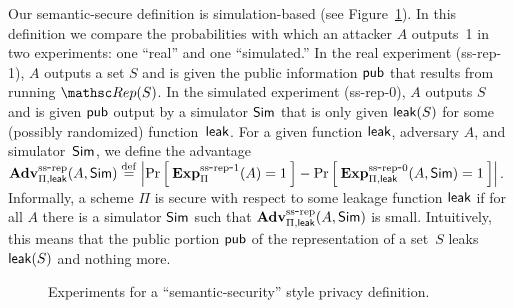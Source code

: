 Our semantic-secure definition is simulation-based (see Figure~\ref{fig:privacy-ss}).
In this definition we compare the probabilities with which an attacker $A$ outputs~1
in two experiments: one ``real'' and one ``simulated.''
In the real experiment (ss-rep-1), $A$ outputs a set $S$  and is given the
public information ${\sf pub}$ that results from running $\Rep(S)$.
In the simulated experiment (ss-rep-0), $A$ outputs $S$ and is given ${\sf pub}$ output
by a simulator ${\sf Sim}$ that is only given ${\sf leak}(S)$ for some (possibly randomized)
function~${\sf leak}$.
For a given function ${\sf leak}$, adversary $A$, and simulator~${\sf Sim}$,
we define the advantage
$\mathrm{\mathbf{Adv}}^{\mathrm{ss\mbox{-}rep}}_{\Pi,{\sf leak}}(A,{\sf Sim}) \stackrel{\rm def}{=}
\left| \Pr\left[\: \mathrm{\mathbf{Exp}}^{\mathrm{ss\mbox{-}rep\mbox{-}1}}_{\Pi}(A)=1 \:\right] -
\Pr\left[\: \mathrm{\mathbf{Exp}}^{\mathrm{ss\mbox{-}rep\mbox{-}0}}_{\Pi,{\sf leak}}(A, {\sf Sim})=1 \:\right] \right|$.
Informally, a scheme $\Pi$ is secure with respect to some leakage function ${\sf leak}$
if for all $A$ there is a simulator ${\sf Sim}$ such that
$\mathrm{\mathbf{Adv}}^{\mathrm{ss\mbox{-}rep}}_{\Pi,{\sf leak}}(A,{\sf Sim})$ is small.
Intuitively, this means that the public portion
${\sf pub}$ of the representation of a set~$S$ leaks~${\sf leak}(S)$ and nothing more.

\begin{figure}[hbtp]
\centering
{}
\caption{Experiments for a ``semantic-security'' style privacy
  definition.}
\label{fig:privacy-ss}
\end{figure}


